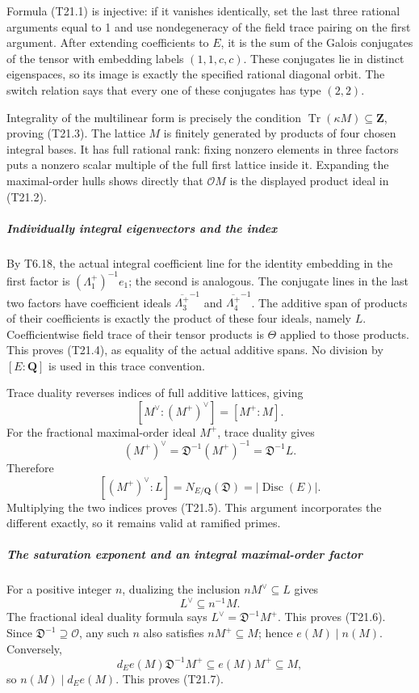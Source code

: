 \documentclass[11pt,a4paper]{article}
\theoremstyle{definition}
\begin{document}
Formula (T21.1) is injective: if it vanishes identically, set the last three rational arguments equal to 1 and use nondegeneracy of the field trace pairing on the first argument. After extending coefficients to \(E\), it is the sum of the Galois conjugates of the tensor with embedding labels \((1,1,c,c)\). These conjugates lie in distinct eigenspaces, so its image is exactly the specified rational diagonal orbit. The switch relation says that every one of these conjugates has type \((2,2)\).

Integrality of the multilinear form is precisely the condition \(\operatorname{Tr}(\kappa M)\subseteq\mathbf Z\), proving (T21.3). The lattice \(M\) is finitely generated by products of four chosen integral bases. It has full rational rank: fixing nonzero elements in three factors puts a nonzero scalar multiple of the full first lattice inside it. Expanding the maximal-order hulls shows directly that \(\mathcal O M\) is the displayed product ideal in (T21.2).

\subparagraph{Individually integral eigenvectors and the index}\label{individually-integral-eigenvectors-and-the-index}

By T6.18, the actual integral coefficient line for the identity embedding in the first factor is \((\Lambda_1^+)^{-1}e_1\); the second is analogous. The conjugate lines in the last two factors have coefficient ideals \(\overline{\Lambda_3^+}^{-1}\) and \(\overline{\Lambda_4^+}^{-1}\). The additive span of products of their coefficients is exactly the product of these four ideals, namely \(L\). Coefficientwise field trace of their tensor products is \(\Theta\) applied to those products. This proves (T21.4), as equality of the actual additive spans. No division by \([E:\mathbf Q]\) is used in this trace convention.

Trace duality reverses indices of full additive lattices, giving \[
 [M^\vee:(M^+)^\vee]=[M^+:M].
\] For the fractional maximal-order ideal \(M^+\), trace duality gives \[
 (M^+)^\vee=\mathfrak D^{-1}(M^+)^{-1}
                    =\mathfrak D^{-1}L.
\] Therefore \[
 [(M^+)^\vee:L]=N_{E/\mathbf Q}(\mathfrak D)
                     =|\operatorname{Disc}(E)|.
\] Multiplying the two indices proves (T21.5). This argument incorporates the different exactly, so it remains valid at ramified primes.

\subparagraph{The saturation exponent and an integral maximal-order factor}\label{the-saturation-exponent-and-an-integral-maximal-order-factor}

For a positive integer \(n\), dualizing the inclusion \(nM^\vee\subseteq L\) gives \[
 L^\vee\subseteq n^{-1}M.
\] The fractional ideal duality formula says \(L^\vee=\mathfrak D^{-1}M^+\). This proves (T21.6). Since \(\mathfrak D^{-1}\supseteq\mathcal O\), any such \(n\) also satisfies \(nM^+\subseteq M\); hence \(e(M)\mid n(M)\). Conversely, \[
 d_E e(M)\mathfrak D^{-1}M^+
  \subseteq e(M)M^+\subseteq M,
\] so \(n(M)\mid d_E e(M)\). This proves (T21.7).
\end{document}
